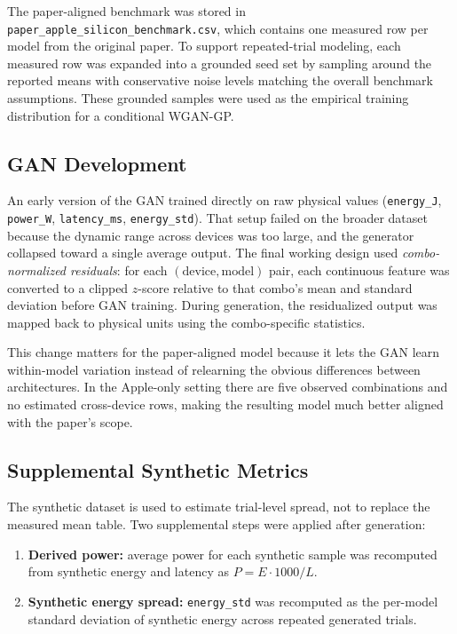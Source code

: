 \documentclass[11pt]{article}
\begin{document}
The paper-aligned benchmark was stored in
\texttt{paper\_apple\_silicon\_benchmark.csv}, which contains one measured row
per model from the original paper. To support repeated-trial modeling, each
measured row was expanded into a grounded seed set by sampling around the
reported means with conservative noise levels matching the overall benchmark
assumptions. These grounded samples were used as the empirical training
distribution for a conditional WGAN-GP.

\subsection{GAN Development}
An early version of the GAN trained directly on raw physical values
(\texttt{energy\_J}, \texttt{power\_W}, \texttt{latency\_ms},
\texttt{energy\_std}). That setup failed on the broader dataset because the
dynamic range across devices was too large, and the generator collapsed toward a
single average output. The final working design used \emph{combo-normalized
residuals}: for each $(\text{device}, \text{model})$ pair, each continuous
feature was converted to a clipped $z$-score relative to that combo's mean and
standard deviation before GAN training. During generation, the residualized
output was mapped back to physical units using the combo-specific statistics.

This change matters for the paper-aligned model because it lets the GAN learn
within-model variation instead of relearning the obvious differences between
architectures. In the Apple-only setting there are five observed combinations
and no estimated cross-device rows, making the resulting model much better
aligned with the paper's scope.

\subsection{Supplemental Synthetic Metrics}
The synthetic dataset is used to estimate trial-level spread, not to replace the
measured mean table. Two supplemental steps were applied after generation:
\begin{enumerate}
\item \textbf{Derived power:} average power for each synthetic sample was
recomputed from synthetic energy and latency as
$P = E \cdot 1000 / L$.
\item \textbf{Synthetic energy spread:} \texttt{energy\_std} was recomputed as
the per-model standard deviation of synthetic energy across repeated generated
trials.
\end{enumerate}
\end{document}
